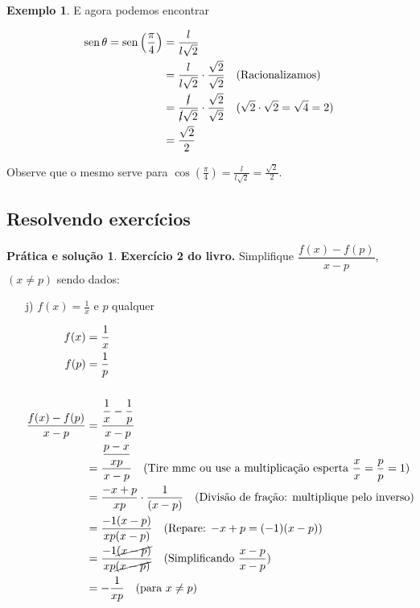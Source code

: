 \documentclass[12pt,openright,twoside,a4paper]{article}
\theoremstyle{definition}
\newtheorem{example}{Exemplo}[section]
\newtheorem{practice}{Prática e solução}[section]
\renewcommand{\sin}{\operatorname{sen}} %
\begin{document}
\begin{example}
		E agora podemos encontrar
		
		\begin{align*}
			\sin{\theta} = \sin{\left(\frac{\pi}{4}\right)} &= \frac{l}{l\sqrt{2}}\\
			&= \frac{l}{l\sqrt{2}} \cdot \frac{\sqrt{2}}{\sqrt{2}} \quad \text{(Racionalizamos)}\\
			&= \frac{\cancel{l}}{\cancel{l}\sqrt{2}} \cdot \frac{\sqrt{2}}{\sqrt{2}} \quad \text{($\sqrt{2} \cdot \sqrt{2} = \sqrt{4} = 2$)}\\
			&= \frac{\sqrt{2}}{2}
		\end{align*}
		
		Observe que o mesmo serve para $\displaystyle \cos{\left(\frac{\pi}{4}\right)} = \frac{l}{l\sqrt{2}} = \frac{\sqrt{2}}{2}$.
		
	\end{example}
	
	\subsection{Resolvendo exercícios}
	
	\begin{practice}
		\textbf{Exercício 2 do livro.} Simplifique $\dfrac{f(x) - f(p)}{x - p}$, $(x \neq p)$ sendo dados:
		
		\begin{enumerate}
			\item[j)] $f(x) = \displaystyle \frac{1}{x}$ e $p$ qualquer
			
			\begin{align*}
				f(x) &= \dfrac{1}{x} \\
				f(p) &= \dfrac{1}{p} \\
				\\
				\dfrac{f(x) - f(p)}{x - p} &= \dfrac{\dfrac{1}{x} - \dfrac{1}{p}}{x - p} \\
				&= \dfrac{\dfrac{p - x}{xp}}{x - p} \quad \text{(Tire mmc ou use a multiplicação esperta $\dfrac{x}{x} = \dfrac{p}{p} = 1$)}\\
				&= \dfrac{-x + p}{xp}\cdot \frac{1}{(x - p)} \quad \text{(Divisão de fração: multiplique pelo inverso)}\\
				&= \dfrac{-1(x - p)}{xp(x - p)} \quad \text{(Repare: $-x + p = (-1)(x - p)$)}\\
				&= \dfrac{-1\cancel{(x - p)}}{xp \cancel{(x - p)}} \quad \text{(Simplificando $\dfrac{x-p}{x-p}$)}\\
				&= -\dfrac{1}{xp} \quad \text{(para } x \ne p\text{)}
			\end{align*}
			
		\end{enumerate}
	\end{practice}
	
\end{document}
